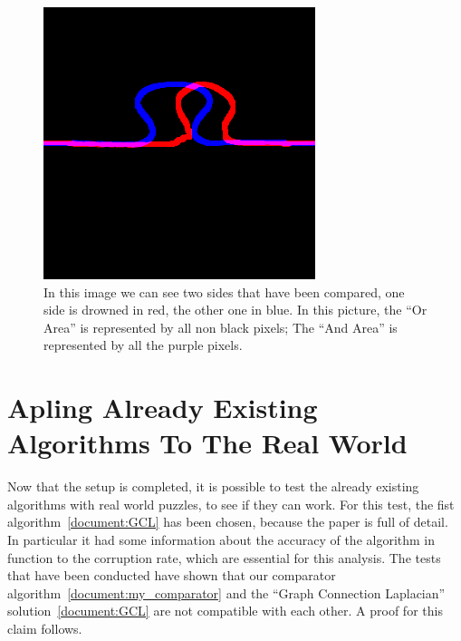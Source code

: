 \documentclass{article}
\begin{document}
\begin{figure}[htbp]
  \centering
  \begin{minipage}[t]{0.44\textwidth}
    \vspace{3pt} %
    \includegraphics[width=\textwidth]{pictures/side_comparation.png}
  \end{minipage}
  \hfill
  \begin{minipage}[t]{0.54\textwidth}
    \caption{\newline
    In this image we can see two sides that have been
    compared, one side is drowned in red, the other one in blue.
    In this picture, the “Or Area” is represented by all non
    black pixels; The “And Area” is represented by all the
    purple pixels.}
  \end{minipage}
\end{figure}
\clearpage

\section{Apling Already Existing Algorithms To The Real World}
Now that the setup is completed, it is possible to test the already existing
algorithms with real world puzzles, to see if they can work. For this test,
the fist algorithm~\ref{document:GCL} has been chosen, because the paper is full of detail.
In particular it had some information about the accuracy of the algorithm in
function to the corruption rate, which are essential for this analysis.
\newline \newline
The tests that have been conducted have shown that our comparator algorithm~\ref{document:my_comparator}
and the “Graph Connection Laplacian” solution~\ref{document:GCL} are not compatible with each other.
A proof for this claim follows.
\end{document}
